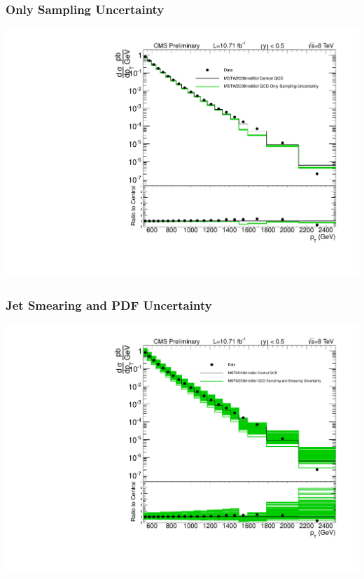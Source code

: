 \documentclass{beamer}
\begin{document}
\begin{frame}
	\frametitle{Only Sampling Uncertainty}
	\begin{*figure}
\begin{center}
 \vspace {0.05 in}
 \includegraphics [width=0.7\linewidth] {xsec_MSTW_QCD_only_sampling.pdf}
 \vspace {0.05 in}
\caption{}
\end{center}
\end{*figure} 
\end{frame}

\begin{frame}
	\frametitle{Jet Smearing and PDF Uncertainty}
	\begin{*figure}
\begin{center}
 \vspace {0.05 in}
 \includegraphics [width=0.7\linewidth] {xsec_MSTW_QCD_sampled_and_smeared.pdf}
 \vspace {0.05 in}
\caption{ }
\end{center}
\end{*figure} 
\end{frame}
\end{document}
